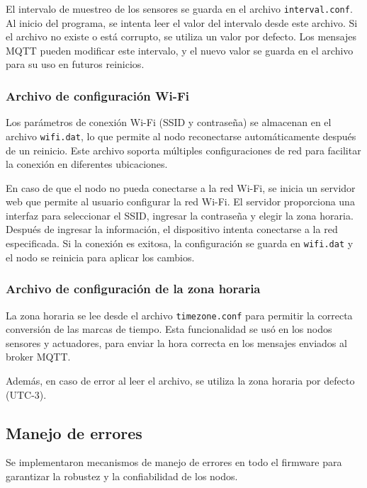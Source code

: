 El intervalo de muestreo de los sensores se guarda en el archivo
\texttt{interval.conf}. Al inicio del programa, se intenta leer el valor del
intervalo desde este archivo. Si el archivo no existe o está corrupto, se
utiliza un valor por defecto. Los mensajes MQTT pueden modificar este
intervalo, y el nuevo valor se guarda en el archivo para su uso en futuros
reinicios.

\subsubsection{Archivo de configuración Wi-Fi}

Los parámetros de conexión Wi-Fi (SSID y contraseña) se almacenan en el archivo
\texttt{wifi.dat}, lo que permite al nodo reconectarse automáticamente después
de un reinicio. Este archivo soporta múltiples configuraciones de red para
facilitar la conexión en diferentes ubicaciones.

En caso de que el nodo no pueda conectarse a la red Wi-Fi, se inicia un
servidor web que permite al usuario configurar la red Wi-Fi. El servidor
proporciona una interfaz para seleccionar el SSID, ingresar la contraseña y
elegir la zona horaria. Después de ingresar la información, el dispositivo
intenta conectarse a la red especificada. Si la conexión es exitosa, la
configuración se guarda en \texttt{wifi.dat} y el nodo se reinicia para aplicar
los cambios.

\subsubsection{Archivo de configuración de la zona horaria}

La zona horaria se lee desde el archivo \texttt{timezone.conf} para permitir la
correcta conversión de las marcas de tiempo. Esta funcionalidad se usó en los
nodos sensores y actuadores, para enviar la hora correcta en los mensajes
enviados al broker MQTT.

Además, en caso de error al leer el archivo, se utiliza la zona horaria por
defecto (UTC-3).


\subsection{Manejo de errores}

Se implementaron mecanismos de manejo de errores en todo el firmware para
garantizar la robustez y la confiabilidad de los nodos.

